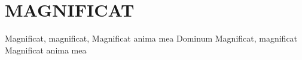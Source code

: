 \documentclass[../../../songbook.tex]{subfiles}
\begin{document}
\TabPositions{8cm} %
\section*{MAGNIFICAT}
{}
\vspace{0.5cm}

Magnificat, magnificat,			 \newline
Magnificat anima mea Dominum	\newline
Magnificat, magnificat			\newline
Magnificat anima mea			\newline
\end{document}
